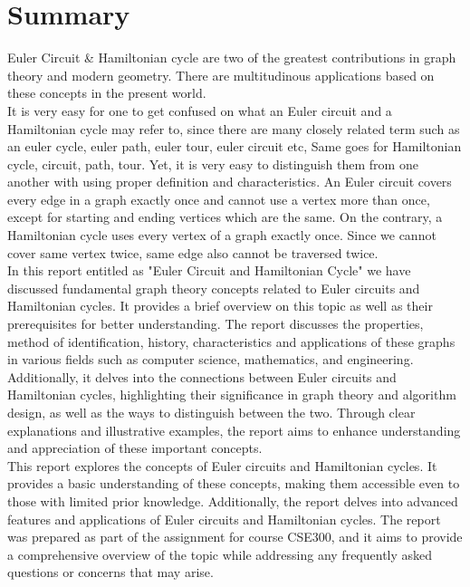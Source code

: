 \documentclass[14pt, times, a4paper]{extarticle}
\begin{document}
\section*{Summary}
Euler Circuit \& Hamiltonian cycle are two of the greatest contributions in graph theory and modern geometry. There are multitudinous applications based on these concepts in the present world.\\[0.3cm]
It is very easy for one to get confused on what an Euler circuit and a Hamiltonian cycle may refer to, since there are many closely related term such as an euler cycle, euler path, euler tour, euler circuit etc, Same goes for Hamiltonian cycle, circuit, path, tour. Yet, it is very easy to distinguish them from one another with using proper definition and characteristics.  An Euler circuit covers every edge in a graph exactly once and cannot use a vertex more than once, except for starting and ending vertices which are the same. On the contrary, a Hamiltonian cycle uses every vertex of a graph exactly once. Since we cannot cover same vertex twice, same edge also cannot be traversed twice.\\[0.3cm]
In this report entitled as "Euler Circuit and Hamiltonian Cycle" we have discussed fundamental graph theory concepts related to Euler circuits and Hamiltonian cycles. It provides a brief overview on this topic as well as their prerequisites for better understanding. The report discusses the properties, method of identification, history, characteristics and applications of these graphs in various fields such as computer science, mathematics, and engineering. Additionally, it delves into the connections between Euler circuits and Hamiltonian cycles, highlighting their significance in graph theory and algorithm design, as well as the ways to distinguish between the two. Through clear explanations and illustrative examples, the report aims to enhance understanding and appreciation of these important concepts.\\[0.3cm]
This report explores the concepts of Euler circuits and Hamiltonian cycles. It provides a basic understanding of these concepts, making them accessible even to those with limited prior knowledge. Additionally, the report delves into advanced features and applications of Euler circuits and Hamiltonian cycles. The report was prepared as part of the assignment for course CSE300, and it aims to provide a comprehensive overview of the topic while addressing any frequently asked questions or concerns that may arise.

\newpage
\end{document}
